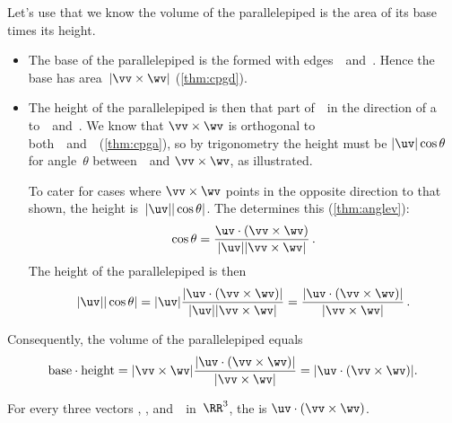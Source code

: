 %
Let's use that we know the volume of the parallelepiped is the area of its base times its height.
\begin{itemize}
\item The base of the parallelepiped is the  formed with edges~\vv\ and~\wv.
Hence the base has area~\(|\vv\times\wv|\) (\cref{thm:cpgd}).

\item 
\begin{figbox}{}%
The height of the parallelepiped is then that part of~\uv\ in the direction of a  to~\vv\ and~\wv.
We know that \(\vv\times\wv\) is orthogonal to both~\vv\ and~\wv\ (\cref{thm:cpga}), so by trigonometry the height must be \(|\uv|\cos\theta\) for angle~\(\theta\) between~\uv\ and \(\vv\times\wv\), as illustrated.
\end{figbox}

To cater for cases where \(\vv\times\wv\) points in the opposite direction to that shown, the height is~\(|\uv||\cos\theta|\).
The   determines this  (\cref{thm:anglev}):
\begin{equation*}
\cos\theta=\frac{\uv\cdot(\vv\times\wv)}{|\uv||\vv\times\wv|}\,.
\end{equation*}
The height of the parallelepiped is then
\begin{equation*}
|\uv||\cos\theta|=|\uv|\frac{|\uv\cdot(\vv\times\wv)|}{|\uv||\vv\times\wv|}
=\frac{|\uv\cdot(\vv\times\wv)|}{|\vv\times\wv|}\,.
\end{equation*}
\end{itemize}
Consequently, the volume of the parallelepiped equals
\begin{equation*}
\text{base}\cdot\text{height}
=|\vv\times\wv|\frac{|\uv\cdot(\vv\times\wv)|}{|\vv\times\wv|}
=|\uv\cdot(\vv\times\wv)|.
\end{equation*}



\begin{definition} \label{def:sctrpr}
For every three vectors \uv, \vv, and~\wv\ in~\(\RR^3\), the  is \(\uv\cdot(\vv\times\wv)\).
\end{definition}


